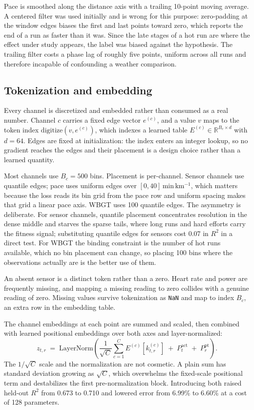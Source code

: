 Pace is smoothed along the distance axis with a trailing 10-point moving average. A centered filter
was used initially and is wrong for this purpose: zero-padding at the window edges biases the first
and last points toward zero, which reports the end of a run as faster than it was. Since the late
stages of a hot run are where the effect under study appears, the label was biased against the
hypothesis. The trailing filter costs a phase lag of roughly five points, uniform across all runs
and therefore incapable of confounding a weather comparison.

\subsection{Tokenization and embedding}

Every channel is discretized and embedded rather than consumed as a real number. Channel $c$ carries
a fixed edge vector $e^{(c)}$, and a value $v$ maps to the token index $\mathrm{digitize}(v,
e^{(c)})$, which indexes a learned table $E^{(c)} \in \mathbb{R}^{B_c \times d}$ with $d = 64$. Edges
are fixed at initialization: the index enters an integer lookup, so no gradient reaches the edges
and their placement is a design choice rather than a learned quantity.

Most channels use $B_c = 500$ bins. Placement is per-channel. Sensor channels use quantile edges;
pace uses uniform edges over $[0, 40]\,\mathrm{min\,km^{-1}}$, which matters because the loss reads
its bin grid from the pace row and uniform spacing makes that grid a linear pace axis. WBGT uses 100
quantile edges. The asymmetry is deliberate. For sensor channels, quantile placement concentrates
resolution in the dense middle and starves the sparse tails, where long runs and hard efforts carry
the fitness signal; substituting quantile edges for sensors cost 0.07 in $R^2$ in a direct test. For
WBGT the binding constraint is the number of hot runs available, which no bin placement can change,
so placing 100 bins where the observations actually are is the better use of them.

An absent sensor is a distinct token rather than a zero. Heart rate and power are frequently missing,
and mapping a missing reading to zero collides with a genuine reading of zero. Missing values survive
tokenization as \texttt{NaN} and map to index $B_c$, an extra row in the embedding table.

The channel embeddings at each point are summed and scaled, then combined with learned positional
embeddings over both axes and layer-normalized:
\begin{equation}
  z_{t,r} \;=\; \mathrm{LayerNorm}\!\left(\frac{1}{\sqrt{C}}\sum_{c=1}^{C} E^{(c)}\!\left[k^{(c)}_{t,r}\right]
                \;+\; P^{\mathrm{act}}_{t} \;+\; P^{\mathrm{pt}}_{r}\right).
\end{equation}
The $1/\sqrt{C}$ scale and the normalization are not cosmetic. A plain sum has standard deviation
growing as $\sqrt{C}$, which overwhelms the fixed-scale positional term and destabilizes the first
pre-normalization block. Introducing both raised held-out $R^2$ from 0.673 to 0.710 and lowered
error from 6.99\% to 6.60\% at a cost of 128 parameters.

